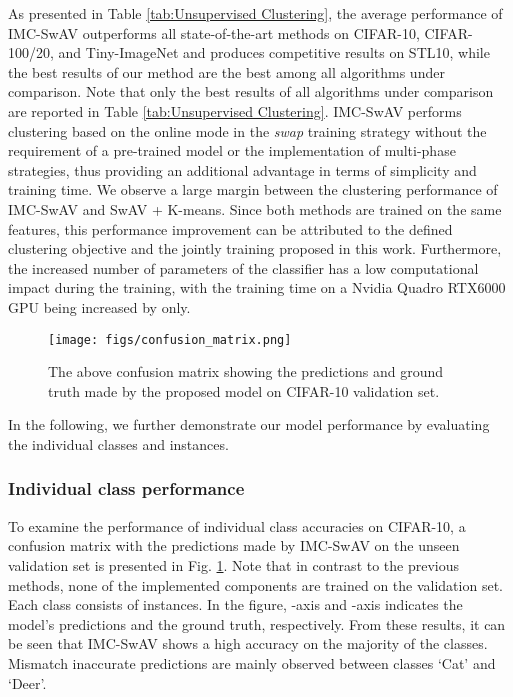 \documentclass[journal]{IEEEtran}
\begin{document}
As presented in Table \ref{tab:Unsupervised Clustering}, the average performance of IMC-SwAV outperforms all state-of-the-art methods on CIFAR-10, CIFAR-100/20, and Tiny-ImageNet and produces competitive results on STL10, while the best results of our method are the best among all algorithms under comparison. Note that only the best results of all algorithms under comparison are reported in Table \ref{tab:Unsupervised Clustering}. IMC-SwAV performs clustering based on the online mode in the \textit{swap} training strategy without the requirement of a pre-trained model or the implementation of multi-phase strategies, thus providing an additional advantage in terms of simplicity and training time. We observe a large margin between the clustering performance of IMC-SwAV and SwAV + K-means. Since both methods are trained on the same features, this performance improvement can be attributed to the defined clustering objective and the jointly training proposed in this work. Furthermore, the increased number of parameters of the classifier has a low computational impact during the training, with the training time on a Nvidia Quadro RTX6000 GPU being increased by  only. 

\begin{figure}[t]
    \centering
    \texttt{[image: figs/confusion\_matrix.png]}
    \caption{The above confusion matrix showing the predictions and ground truth made by the proposed model on CIFAR-10 validation set. 
    }
   \label{fig:confusion matrix}
\end{figure}

In the following, we further demonstrate our model performance by evaluating the individual classes and instances.

\subsubsection{Individual class performance} 
To examine the performance of individual class accuracies on CIFAR-10, a confusion matrix with the predictions made by IMC-SwAV on the unseen validation set is presented in Fig. \ref{fig:confusion matrix}. Note that in contrast to the previous methods, none of the implemented components are trained on the validation set. Each class consists of  instances. In the figure,  -axis and  -axis indicates the model's predictions and the ground truth, respectively. From these results, it can be seen that IMC-SwAV shows a high accuracy on the majority of the classes. Mismatch inaccurate predictions are mainly observed between classes `Cat' and `Deer'.
\end{document}
